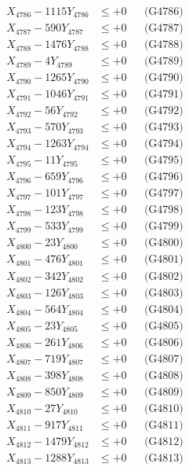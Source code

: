\documentclass[a4paper,10pt]{article}
\begin{document}
{\begin{align}
X_{4786} - 1115Y_{4786} &\leq +0 && \text{(G4786)} \\
X_{4787} - 590Y_{4787} &\leq +0 && \text{(G4787)} \\
X_{4788} - 1476Y_{4788} &\leq +0 && \text{(G4788)} \\
X_{4789} - 4Y_{4789} &\leq +0 && \text{(G4789)} \\
X_{4790} - 1265Y_{4790} &\leq +0 && \text{(G4790)} \\
\allowbreak
X_{4791} - 1046Y_{4791} &\leq +0 && \text{(G4791)} \\
X_{4792} - 56Y_{4792} &\leq +0 && \text{(G4792)} \\
X_{4793} - 570Y_{4793} &\leq +0 && \text{(G4793)} \\
X_{4794} - 1263Y_{4794} &\leq +0 && \text{(G4794)} \\
X_{4795} - 11Y_{4795} &\leq +0 && \text{(G4795)} \\
X_{4796} - 659Y_{4796} &\leq +0 && \text{(G4796)} \\
X_{4797} - 101Y_{4797} &\leq +0 && \text{(G4797)} \\
X_{4798} - 123Y_{4798} &\leq +0 && \text{(G4798)} \\
X_{4799} - 533Y_{4799} &\leq +0 && \text{(G4799)} \\
X_{4800} - 23Y_{4800} &\leq +0 && \text{(G4800)} \\
\allowbreak
X_{4801} - 476Y_{4801} &\leq +0 && \text{(G4801)} \\
X_{4802} - 342Y_{4802} &\leq +0 && \text{(G4802)} \\
X_{4803} - 126Y_{4803} &\leq +0 && \text{(G4803)} \\
X_{4804} - 564Y_{4804} &\leq +0 && \text{(G4804)} \\
X_{4805} - 23Y_{4805} &\leq +0 && \text{(G4805)} \\
X_{4806} - 261Y_{4806} &\leq +0 && \text{(G4806)} \\
X_{4807} - 719Y_{4807} &\leq +0 && \text{(G4807)} \\
X_{4808} - 398Y_{4808} &\leq +0 && \text{(G4808)} \\
X_{4809} - 850Y_{4809} &\leq +0 && \text{(G4809)} \\
X_{4810} - 27Y_{4810} &\leq +0 && \text{(G4810)} \\
\allowbreak
X_{4811} - 917Y_{4811} &\leq +0 && \text{(G4811)} \\
X_{4812} - 1479Y_{4812} &\leq +0 && \text{(G4812)} \\
X_{4813} - 1288Y_{4813} &\leq +0 && \text{(G4813)} \\

\end{align}}
\end{document}
